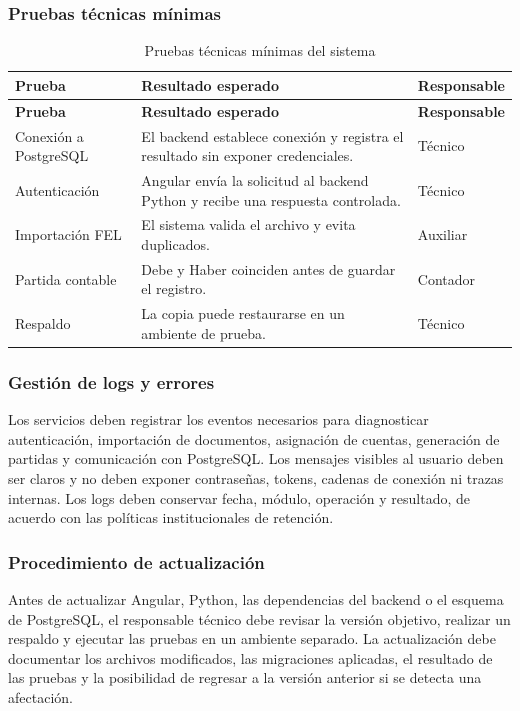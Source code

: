\subsubsection{Pruebas técnicas mínimas}
\begin{longtable}{p{3.5cm}p{7.5cm}p{3cm}}
\caption{Pruebas técnicas mínimas del sistema}\label{tab:B_pruebas_tecnicas}\\
\toprule
\textbf{Prueba} & \textbf{Resultado esperado} & \textbf{Responsable}\\
\midrule
\endfirsthead
\toprule
\textbf{Prueba} & \textbf{Resultado esperado} & \textbf{Responsable}\\
\midrule
\endhead
\endfoot
\bottomrule
\endlastfoot
Conexión a PostgreSQL & El backend establece conexión y registra el resultado sin exponer credenciales. & Técnico\\
Autenticación & Angular envía la solicitud al backend Python y recibe una respuesta controlada. & Técnico\\
Importación FEL & El sistema valida el archivo y evita duplicados. & Auxiliar\\
Partida contable & Debe y Haber coinciden antes de guardar el registro. & Contador\\
Respaldo & La copia puede restaurarse en un ambiente de prueba. & Técnico\\
\end{longtable}

\subsubsection{Gestión de logs y errores}
Los servicios deben registrar los eventos necesarios para diagnosticar autenticación, importación de documentos, asignación de cuentas, generación de partidas y comunicación con PostgreSQL. Los mensajes visibles al usuario deben ser claros y no deben exponer contraseñas, tokens, cadenas de conexión ni trazas internas. Los logs deben conservar fecha, módulo, operación y resultado, de acuerdo con las políticas institucionales de retención.

\subsubsection{Procedimiento de actualización}
Antes de actualizar Angular, Python, las dependencias del backend o el esquema de PostgreSQL, el responsable técnico debe revisar la versión objetivo, realizar un respaldo y ejecutar las pruebas en un ambiente separado. La actualización debe documentar los archivos modificados, las migraciones aplicadas, el resultado de las pruebas y la posibilidad de regresar a la versión anterior si se detecta una afectación.

